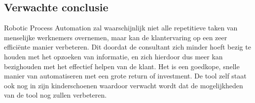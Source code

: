\subsection{Verwachte conclusie}
\label{Verwachte conclusie} 
Robotic Process Automation zal waarschijnlijk niet alle repetitieve taken van menselijke werknemers overnemen, maar kan de klantervaring op een zeer efficiënte manier verbeteren. Dit doordat de consultant zich minder hoeft bezig te houden met het opzoeken van informatie, en zich hierdoor dus meer kan bezighouden met het effectief helpen van de klant. Het is een goedkope, snelle manier van automatiseren met een grote return of investment. De tool zelf staat ook nog in zijn kinderschoenen waardoor verwacht wordt dat de mogelijkheden van de tool nog zullen verbeteren.  





